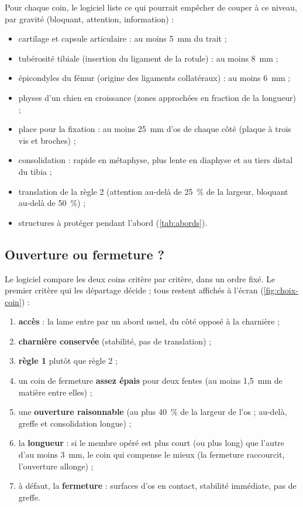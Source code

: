 Pour chaque coin, le logiciel liste ce qui pourrait empêcher de couper à ce niveau, par gravité (bloquant, attention,
information) :
\begin{itemize}
  \item cartilage et capsule articulaire : au moins 5~mm du trait ;
  \item tubérosité tibiale (insertion du ligament de la rotule) : au moins 8~mm ;
  \item épicondyles du fémur (origine des ligaments collatéraux) : au moins 6~mm ;
  \item physes d'un chien en croissance (zones approchées en fraction de la longueur) ;
  \item place pour la fixation : au moins 25~mm d'os de chaque côté (plaque à trois vis et broches) ;
  \item consolidation : rapide en métaphyse, plus lente en diaphyse et au tiers distal du tibia ;
  \item translation de la règle 2 (attention au-delà de 25~\% de la largeur, bloquant au-delà de 50~\%) ;
  \item structures à protéger pendant l'abord (\cref{tab:abords}).
\end{itemize}

\subsection{Ouverture ou fermeture ?}
\label{sec:choix-coin}

Le logiciel compare les deux coins critère par critère, dans un ordre fixé. Le premier critère qui les départage
décide ; tous restent affichés à l'écran (\cref{fig:choix-coin}) :
\begin{enumerate}
  \item \textbf{accès} : la lame entre par un abord usuel, du côté opposé à la charnière ;
  \item \textbf{charnière conservée} (stabilité, pas de translation) ;
  \item \textbf{règle 1} plutôt que règle 2 ;
  \item un coin de fermeture \textbf{assez épais} pour deux fentes (au moins 1,5~mm de matière entre elles) ;
  \item une \textbf{ouverture raisonnable} (au plus 40~\% de la largeur de l'os ; au-delà, greffe et consolidation
  longue) ;
  \item la \textbf{longueur} : si le membre opéré est plus court (ou plus long) que l'autre d'au moins 3~mm, le coin qui
  compense le mieux (la fermeture raccourcit, l'ouverture allonge) ;
  \item à défaut, la \textbf{fermeture} : surfaces d'os en contact, stabilité immédiate, pas de greffe.
\end{enumerate}

